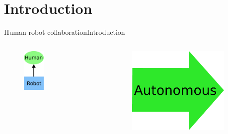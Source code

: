 \section{Introduction}


\begin{frame}{Human-robot collaboration}{Introduction}

\begin{columns}

\begin{minipage}{\textwidth}
\begin{figure}
\centering
\includegraphics[width = 0.34\textwidth]{./figure/HR_org_chart1}
\end{figure}
\end{minipage}

\begin{minipage}{\textwidth}
\begin{figure}
\centering
\includegraphics[width = 0.9\textwidth]{./figure/arrow_autonomous}
\end{figure}
\end{minipage}


\end{columns}
\end{frame}
